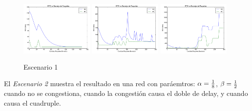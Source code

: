         \begin{figure}[H]
            \center
	        
		    \includegraphics[width=0.32\textwidth]{imagenes/rtt_vs_n_2_4.pdf}
		    \includegraphics[width=0.32\textwidth]{imagenes/congestion_50_2_4.pdf}
		    \includegraphics[width=0.32\textwidth]{imagenes/congestion_100_2_4.pdf}

            \caption{Escenario 1}
	
        \end{figure}          
  
        El \emph{Escenario 2} muestra el resultado en una red con
        par\'aemtros: $\alpha={{1}\over{8}}$, $\beta={{1}\over{2}}$ 
        cuando no se congestiona, cuando la congesti\'on causa el doble de
        delay, y cuando causa el cuadruple.


